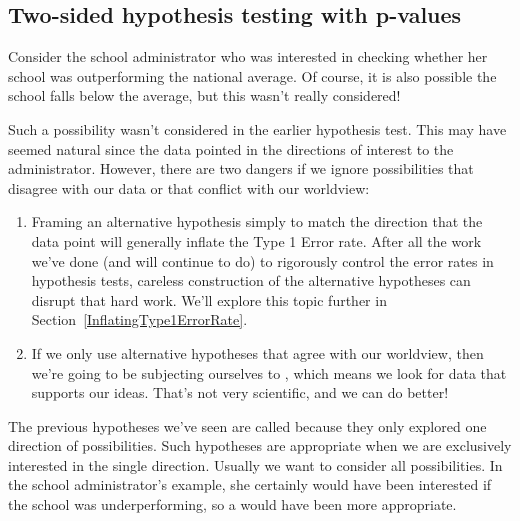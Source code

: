 \subsection{Two-sided hypothesis testing with p-values}
\label{twoSidedTestsWithPValues}

Consider the school administrator who was interested in checking whether her school was outperforming the national average. Of course, it is also possible the school falls below the average, but this wasn't really considered!

Such a possibility wasn't considered in the earlier hypothesis test. This may have seemed natural since the data pointed in the directions of interest to the administrator. However, there are two dangers if we ignore possibilities that disagree with our data or that conflict with our worldview:
\begin{enumerate}
\item Framing an alternative hypothesis simply to match the direction that the data point will generally inflate the Type 1 Error rate. After all the work we've done (and will continue to do) to rigorously control the error rates in hypothesis tests, careless construction of the alternative hypotheses can disrupt that hard work. We'll explore this topic further in Section~\ref{InflatingType1ErrorRate}.
\item If we only use alternative hypotheses that agree with our worldview, then we're going to be subjecting ourselves to , which means we look for data that supports our ideas. That's not very scientific, and we can do better!
\end{enumerate}
The previous hypotheses we've seen are called  because they only explored one direction of possibilities. Such hypotheses are appropriate when we are exclusively interested in the single direction. Usually we want to consider all possibilities. In the school administrator's example, she certainly would have been interested if the school was underperforming, so a  would have been more appropriate.

